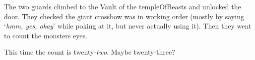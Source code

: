 \begin{exampletext}
The two \glspl{guard} climbed to the Vault of the \gls{templeOfBeasts} and unlocked the door.
They checked the giant crossbow was in working order (mostly by saying `\textit{hmm, yes, okay}' while poking at it, but never actually using it).
Then they went to count the \glspl{monster} eyes.



This time the count is twenty-\emph{two}.
Maybe twenty-three?



\end{exampletext}



% 
% 

